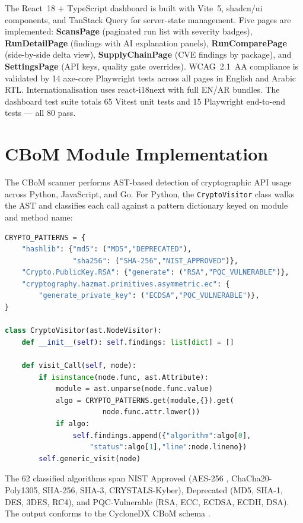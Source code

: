 The React~18 + TypeScript \cite{typescript_docs} dashboard is built with Vite~5, shadcn/ui components, and TanStack Query for server-state management. Five pages are implemented: \textbf{ScansPage} (paginated run list with severity badges), \textbf{RunDetailPage} (findings with AI explanation panels), \textbf{RunComparePage} (side-by-side delta view), \textbf{SupplyChainPage} (CVE findings by package), and \textbf{SettingsPage} (API keys, quality gate overrides). WCAG~2.1~AA compliance \cite{wcag21} is validated by 14 axe-core Playwright tests across all pages in English and Arabic RTL. Internationalisation uses react-i18next with full EN/AR bundles. The dashboard test suite totals 65 Vitest unit tests and 15 Playwright end-to-end tests --- all 80 pass.

\clearpage
\section{CBoM Module Implementation}
\label{sec:cbom_impl}

The CBoM scanner performs AST-based detection of cryptographic API usage across Python, JavaScript, and Go. For Python, the \texttt{CryptoVisitor} class walks the AST and classifies each call against a pattern dictionary keyed on module and method name:

\begin{lstlisting}[language=Python, basicstyle=\footnotesize\ttfamily, caption={CBoM AST Visitor (Python, core pattern)}]
CRYPTO_PATTERNS = {
    "hashlib": {"md5": ("MD5","DEPRECATED"),
                "sha256": ("SHA-256","NIST_APPROVED")},
    "Crypto.PublicKey.RSA": {"generate": ("RSA","PQC_VULNERABLE")},
    "cryptography.hazmat.primitives.asymmetric.ec": {
        "generate_private_key": ("ECDSA","PQC_VULNERABLE")},
}

class CryptoVisitor(ast.NodeVisitor):
    def __init__(self): self.findings: list[dict] = []

    def visit_Call(self, node):
        if isinstance(node.func, ast.Attribute):
            module = ast.unparse(node.func.value)
            algo = CRYPTO_PATTERNS.get(module,{}).get(
                       node.func.attr.lower())
            if algo:
                self.findings.append({"algorithm":algo[0],
                    "status":algo[1],"line":node.lineno})
        self.generic_visit(node)
\end{lstlisting}

The 62 classified algorithms span NIST Approved (AES-256 \cite{nist_fips_197}, ChaCha20-Poly1305, SHA-256, SHA-3, CRYSTALS-Kyber), Deprecated (MD5, SHA-1, DES, 3DES, RC4), and PQC-Vulnerable (RSA, ECC, ECDSA, ECDH, DSA). The output conforms to the CycloneDX CBoM schema \cite{cyclonedx}.

